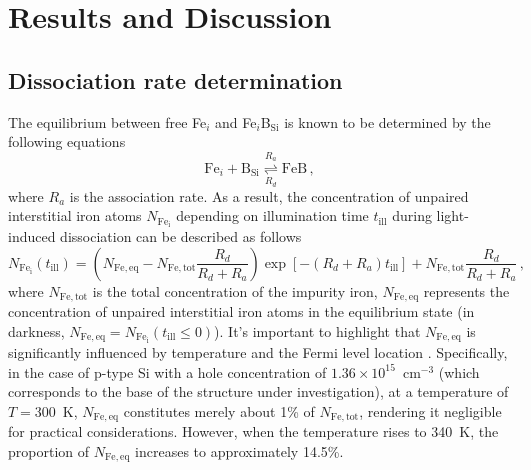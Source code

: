 \documentclass{WileyMSP-template}
\begin{document}
%
%
%
%


\section{Results and Discussion}

\subsection{Dissociation rate determination}\label{SecR}

The equilibrium between free Fe$_i$ and Fe$_i$B$_\mathrm{Si}$ is known to be determined by the following equations \cite{FeB:kinetic,Sun2021,FeBAssJAP2014}
\begin{equation}
\label{eqReac}
\mathrm{Fe}_i+\mathrm{B}_\mathrm{Si}  \overset{R_a}{\underset{R_d}{\rightleftharpoons{}}} \mathrm{FeB}\,,
\end{equation}
where
$R_a$ is the association rate.
As a result, the concentration of unpaired interstitial iron atoms $N_\mathrm{Fe_i}$ depending on illumination time $t_\mathrm{ill}$
during light-induced dissociation can be described as follows \cite{FeBLight2,FeBKin2019,Olikh2021JAP}
\begin{equation}
\label{eqNfeill}
N_\mathrm{Fe_i}(t_\mathrm{ill})=\left(N_\mathrm{Fe,eq}-N_\mathrm{Fe,tot}
\frac{R_d}{R_d+R_a}\right)\exp[-(R_d+R_a)t_\mathrm{ill}]+N_\mathrm{Fe,tot}\frac{R_d}{R_d+R_a}\,,
\end{equation}
where
$N_\mathrm{Fe,tot}$ is the total concentration of the impurity iron,
$N_\mathrm{Fe,eq}$ represents the concentration of unpaired interstitial iron atoms in the equilibrium state
(in darkness, $N_\mathrm{Fe,eq}=N_\mathrm{Fe_i}(t_\mathrm{ill}\leq0)$).
It's important to highlight that $N_\mathrm{Fe,eq}$ is significantly influenced
by temperature and the Fermi level location \cite{FeB:kinetic}.
Specifically, in the case of p-type Si with a hole concentration of $1.36\times10^{15}$~cm$^{-3}$
(which corresponds to the base of the structure under investigation),
at a temperature of $T=300$~K, $N_\mathrm{Fe,eq}$ constitutes merely about 1\% of $N_\mathrm{Fe,tot}$,
rendering it negligible for practical considerations.
However, when the temperature rises to 340~K, the proportion of $N_\mathrm{Fe,eq}$ increases to approximately 14.5\%.
\end{document}
